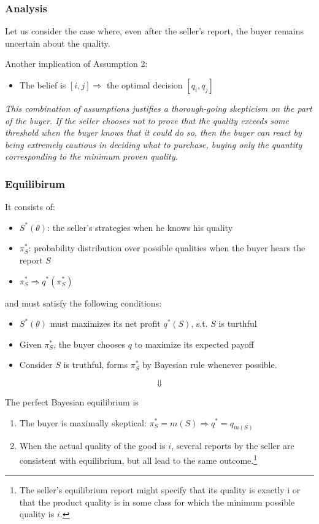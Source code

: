 \documentclass[12pt,letterpaper]{article}
\begin{document}
\subsubsection{Analysis}


Let us consider the case where, even after the seller’s report, the buyer remains uncertain about the quality.

Another implication of Assumption 2:
\begin{itemize}
	\item The belief is $[i, j] \Rightarrow$ the optimal decision $[q_i, q_j]$
\end{itemize}

\textit{This combination of assumptions justifies a thorough-going skepticism on the part of the buyer. If the seller chooses not to prove that the quality exceeds some threshold when the buyer knows that it could do so, then the buyer can react by being extremely cautious in deciding what to purchase, buying only the quantity corresponding to the minimum proven quality.}

\subsubsection{Equilibirum}

It consists of: 
\begin{itemize}
	\item $S^*(\theta)$: the seller's strategies when he knows his quality
	\item $\pi^*_S$: probability distribution over possible qualities when the buyer hears the report $S$
	\item $\pi^*_S \Rightarrow q^*(\pi^*_S)$
	\end{itemize}

and must satisfy the following conditions:
\begin{itemize}
	\item $S^*(\theta)$ must maximizes its net profit $q^*(S)$, s.t. $S$ is turthful
	\item Given $\pi^*_S$, the buyer chooses $q$ to maximize its expected payoff 
	\item Consider $S$ is truthful, forms $\pi^*_S$ by Bayesian rule whenever possible.
\end{itemize}

\[\Downarrow\]

The perfect Bayesian equilibrium is
\begin{enumerate}
	\item The buyer is maximally skeptical: $\pi^*_S = m(S) \Rightarrow q^* = q_{m(S)}$
	\item When the actual quality of the good is
	$i$, several reports by the seller are
	consistent with equilibrium, but all lead to the same outcome.\footnote{The seller’s equilibrium
		report might specify that its quality is exactly i or that the product quality
		is in some class for which the minimum possible quality is $i$.}
\end{enumerate}
\end{document}
